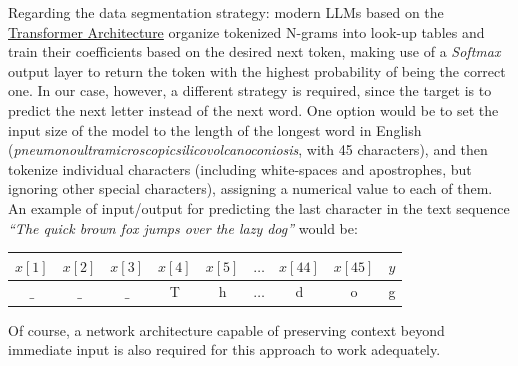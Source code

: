 \documentclass{scrartcl}
\begin{document}
  Regarding the data segmentation strategy: modern LLMs based on the \href{https://en.wikipedia.org/wiki/Transformer_(machine_learning_model)}{Transformer Architecture} organize tokenized N-grams into look-up tables and train their coefficients based on the desired next token, making use of a \textit{Softmax} output layer to return the token with the highest probability of being the correct one. In our case, however, a different strategy is required, since the target is to predict the next letter instead of the next word. One option would be to set the input size of the model to the length of the longest word in English (\textit{pneumonoultramicroscopicsilicovolcanoconiosis}, with 45 characters), and then tokenize individual characters (including white-spaces and apostrophes, but ignoring other special characters), assigning a numerical value to each of them. An example of input/output for predicting the last character in the text sequence \textit{``The quick brown fox jumps over the lazy dog''} would be:

  \begin{center}
    \begin{tabular}{| c c c c c c c c || c |}
      $x[1]$ & $x[2]$ & $x[3]$ & $x[4]$ & $x[5]$ & $\dots$ & $x[44]$ & $x[45]$ & $y$ \\
      \hline
      $\_$ & $\_$ & $\_$ & T & h & $\dots$ & d & o & g 
    \end{tabular}
  \end{center}

  Of course, a network architecture capable of preserving context beyond immediate input is also required for this approach to work adequately.
\end{document}
